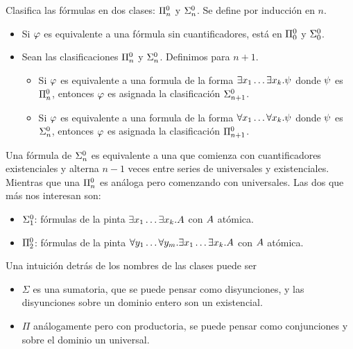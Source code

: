\begin{definition}
    Clasifica las fórmulas en dos clases: $\Pi^0_{n}$ y
    $\Sigma^0_{n}$. Se define por inducción en $n$.

    \begin{itemize}
        \item Si $\varphi$ es equivalente a una fórmula sin cuantificadores, está en
        $\Pi^0_{0}$ y $\Sigma^0_{0}$.
        \item Sean las clasificaciones $\Pi^0_{n}$ y $\Sigma^0_{n}$. Definimos para $n+1$.
        \begin{itemize}
            \item Si $\varphi$ es equivalente a una formula de la forma $\exists
            x_1 \dots \exists x_k. \psi$ donde $\psi$ es
            $\Pi^0_{n}$, entonces $\varphi$ es asignada la clasificación $\Sigma^0_{n+1}$.
    
            \item Si $\varphi$ es equivalente a una formula de la forma $\forall
            x_1 \dots \forall x_k. \psi$ donde $\psi$ es
            $\Sigma^0_{n}$, entonces $\varphi$ es asignada la clasificación $\Pi^0_{n+1}$.
        \end{itemize}
    \end{itemize}

    Una fórmula de $\Sigma^0_{n}$ es equivalente a una que comienza con
    cuantificadores existenciales y alterna $n-1$ veces entre series de
    universales y existenciales. Mientras que una $\Pi^0_{n}$ es análoga pero
    comenzando con universales. Las dos que más nos interesan son:
    \begin{itemize}
        \item $\Sigma^0_{1}$: fórmulas de la pinta $\exists x_1 \dots
        \exists x_k . A$ con $A$ atómica.
        \item $\Pi^0_{2}$: fórmulas de la pinta $\forall y_1 \dots \forall y_m . \exists x_1 \dots \exists x_k . A$ con $A$ atómica.
    \end{itemize}

    Una intuición detrás de los nombres de las clases puede ser
    \begin{itemize}
        \item $\Sigma$ es una sumatoria, que se puede pensar como disyunciones, y las disyunciones sobre un dominio entero son un existencial.
        \item $\Pi$ análogamente pero con productoria, se puede pensar como conjunciones y sobre el dominio un universal.
    \end{itemize}
\end{definition}

